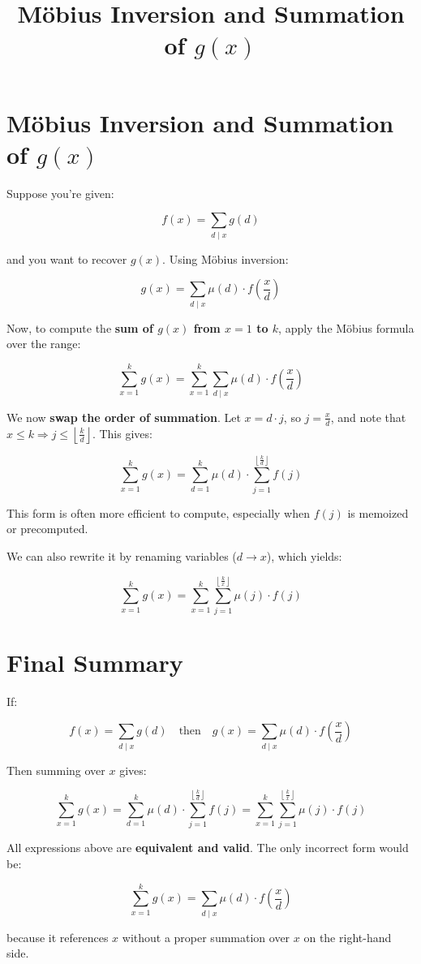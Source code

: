 \documentclass[12pt]{article}
\title{Möbius Inversion and Summation of $g(x)$}
\author{}
\date{}
\begin{document}
\maketitle

\section*{Möbius Inversion and Summation of \texorpdfstring{$g(x)$}{g(x)}}

Suppose you're given:

\[
f(x) = \sum_{d \mid x} g(d)
\]

and you want to recover $g(x)$.  
Using Möbius inversion:

\[
\boxed{
g(x) = \sum_{d \mid x} \mu(d) \cdot f\left( \frac{x}{d} \right)
}
\]

Now, to compute the \textbf{sum of $g(x)$ from $x = 1$ to $k$}, apply the Möbius formula over the range:

\[
\sum_{x = 1}^{k} g(x) = \sum_{x = 1}^{k} \sum_{d \mid x} \mu(d) \cdot f\left( \frac{x}{d} \right)
\]

We now \textbf{swap the order of summation}.  
Let \( x = d \cdot j \), so \( j = \frac{x}{d} \), and note that \( x \le k \Rightarrow j \le \left\lfloor \frac{k}{d} \right\rfloor \). This gives:

\[
\boxed{
\sum_{x=1}^{k} g(x) = \sum_{d=1}^{k} \mu(d) \cdot \sum_{j=1}^{\left\lfloor \frac{k}{d} \right\rfloor} f(j)
}
\]

This form is often more efficient to compute, especially when $f(j)$ is memoized or precomputed.

We can also rewrite it by renaming variables ($d \to x$), which yields:

\[
\boxed{
\sum_{x=1}^{k} g(x) = \sum_{x=1}^{k} \sum_{j=1}^{\left\lfloor \frac{k}{x} \right\rfloor} \mu(j) \cdot f(j)
}
\]

\section*{Final Summary}

If:

\[
f(x) = \sum_{d \mid x} g(d)
\quad \text{then} \quad
g(x) = \sum_{d \mid x} \mu(d) \cdot f\left(\frac{x}{d}\right)
\]

Then summing over $x$ gives:

\[
\sum_{x = 1}^{k} g(x)
= \sum_{d=1}^{k} \mu(d) \cdot \sum_{j=1}^{\left\lfloor \frac{k}{d} \right\rfloor} f(j)
= \sum_{x=1}^{k} \sum_{j=1}^{\left\lfloor \frac{k}{x} \right\rfloor} \mu(j) \cdot f(j)
\]

All expressions above are \textbf{equivalent and valid}.  
The only incorrect form would be:

\[
\sum_{x=1}^{k} g(x) = \sum_{d \mid x} \mu(d) \cdot f\left( \frac{x}{d} \right)
\]

because it references $x$ without a proper summation over $x$ on the right-hand side.
\end{document}

